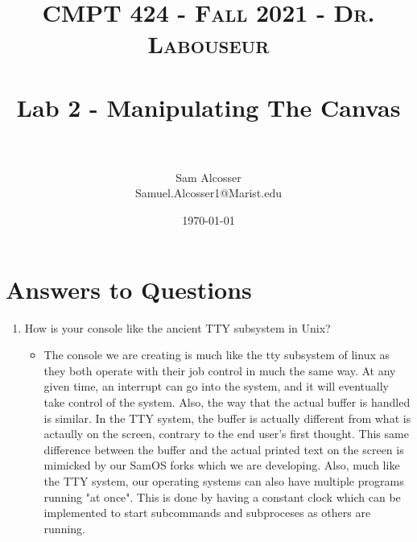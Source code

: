 \documentclass[letterpaper, 10pt]{article}
\title{	
   \normalfont \normalsize 
   \textsc{CMPT 424 - Fall 2021 - Dr. Labouseur} \\[10pt] %
   \horrule{0.5pt} \\[0.25cm] 	%
   \huge Lab 2 - Manipulating The Canvas \\     	    %
   \horrule{0.5pt} \\[0.25cm] 	%
}
\author{Sam Alcosser \\ \normalsize Samuel.Alcosser1@Marist.edu}
\date{\normalsize\today} 	%
\begin{document}
\maketitle %



\section{Answers to Questions}
\begin{enumerate}
     \item How is your console like the ancient TTY subsystem in Unix?
        \begin{itemize}
            \item The console we are creating is much like the tty subsystem of linux as they both operate with their job control in much the same way. At any given time, an interrupt can go into the system, and it will eventually take control of the system. Also, the way that the actual buffer is handled is similar. In the TTY system, the buffer is actually different from what is actaully on the screen, contrary to the end user's first thought. This same difference between the buffer and the actual printed text on the screen is mimicked by our SamOS forks which we are developing. Also, much like the TTY system, our operating systems can also have multiple programs running "at once". This is done by having a constant clock which can be implemented to start subcommands and subproceses as others are running.
        \end{itemize}

\end{enumerate}
\end{document}
